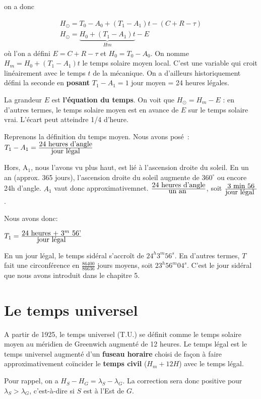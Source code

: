 \documentclass[12pt]{report}
\def\sun{\odot}
\begin{document}
on a donc

$$
\begin{array}{llll}
H_\odot = T_0-A_0 + (T_1-A_1) t - (C+R-\tau)\\
H_\odot = \underbrace{H_0+(T_1-A_1) t}_{Hm} - E
\end{array}
$$
où l'on a défini $E=C+R-\tau$ et $H_0=T_0-A_0$. 
On nomme $H_m=H_0+(T_1-A_1) t$ le temps solaire moyen local. C'est une variable qui croit linéairement avec le temps $t$ de la mécanique. On a d'ailleurs historiquement d\'efini la seconde en \textbf{posant} $T_1-A_1=1$ jour moyen  = 24 heures légales. 


La grandeur $E$ est \textbf{l'équation du temps}. On voit que $H_\sun = H_m - E$ : en d'autres termes, le temps solaire moyen est en avance de  $E$ sur le temps solaire vrai. L'écart peut atteindre 1/4 d'heure.


Reprenons la d\'efinition du temps moyen. Nous avons pos\'e~:  $T_1 - A_1 =
{\mbox{24 heures d'angle}\over \mbox{jour l\'egal}}$


Hors, A$_1$, nous l'avons vu plus haut, est li\'e \`a l'ascension droite du soleil. En un an (approx. 365 jours), l'ascension droite du soleil augmente de $360^\circ$ ou encore 24h d'angle.  $A_1$ vaut donc approximativemnet.
${\mbox{24 heures d'angle}\over \mbox{un an }}$, soit 
${\mbox{3 min 56}\over \mbox{jour l\'egal }}$. 

Nous avons donc: 

$T_1 = {\mbox{24 heures + 3$^m$ 56'} \over \mbox{jour légal}}$

En un jour légal, le temps sidéral s'accroît de $24^h3^m56^s$. En d'autres termes, $T$ fait une circonférence en $\frac{86400}{86636}$ jours moyens, soit $23^h56^m04^s$. C'est le jour sidéral que nous avons introduit dans le chapitre 5.

\section{Le temps universel}

A partir de 1925, le temps universel (T.U.) se définit comme le temps solaire moyen au méridien de Greenwich augmenté de 12 heures. Le temps légal est le temps universel augmenté d'un \textbf{fuseau horaire} choisi de façon à faire approximativement coïncider le \textbf{temps civil} ($H_m + 12H$) avec le temps légal.

Pour rappel, on a $H_S-H_G=\lambda_S-\lambda_G$. La correction sera donc positive pour $\lambda_S > \lambda_G$, c'est-à-dire si $S$ est à l'Est de $G$. 
\end{document}
